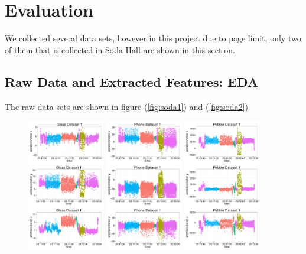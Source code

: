 
\section{Evaluation}

We collected several data sets, however in this project due to page limit, only two of them that is collected in Soda Hall are shown in this section.

\label{sec:evaluation}

\subsection{Raw Data and Extracted Features: EDA}

The raw data sets are shown in figure (\ref{fig:soda1}) and (\ref{fig:soda2})
\begin{figure}
  \centering
  \includegraphics[width=0.3\textwidth]{figures/eda_soda1_glass.pdf}
  \includegraphics[width=0.3\textwidth]{figures/eda_soda1_phone.pdf}
  \includegraphics[width=0.3\textwidth]{figures/eda_soda1_pebble.pdf}

\end{figure}
